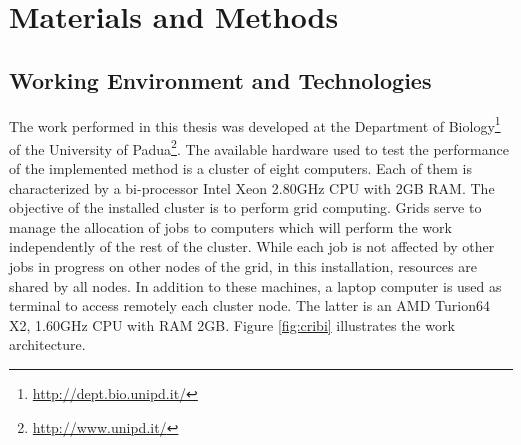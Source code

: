 

\chapter{Materials and Methods}
\label{chap:materials_methods}

\section{Working Environment and Technologies}
\label{sec:working_environment_and_technologies}
The work performed in this thesis was developed at the Department of Biology\footnote{\href{http://dept.bio.unipd.it/}{http://dept.bio.unipd.it/}} of the University of Padua\footnote{\href{http://www.unipd.it/}{http://www.unipd.it/}}. The available hardware used to test the performance of the implemented method is a cluster of eight computers. Each of them is characterized by a bi-processor Intel Xeon 2.80GHz CPU with 2GB RAM. The objective of the installed cluster is to perform grid computing. Grids serve to manage the allocation of jobs to computers which will perform the work independently of the rest of the cluster. While each job is not affected by other jobs in progress on other nodes of the grid, in this installation, resources are shared by all nodes. In addition to these machines, a laptop computer is used as terminal to access remotely each cluster node. The latter is an AMD Turion64 X2, 1.60GHz CPU with RAM 2GB. Figure \ref{fig:cribi} illustrates the work architecture.\\
